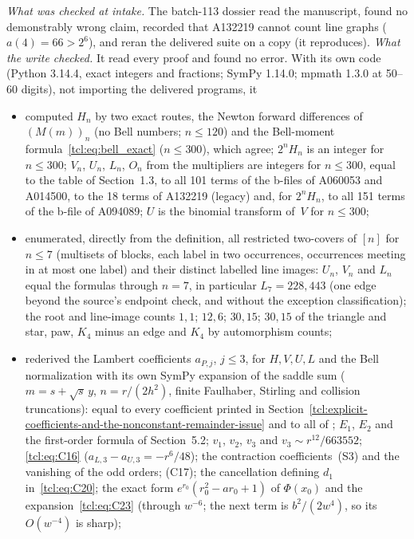 \begin{writenote}
\emph{What was checked at intake.} The batch-113 dossier read the manuscript,
found no demonstrably wrong claim, recorded that A132219 cannot count line
graphs ($a(4)=66>2^6$), and reran the delivered suite on a copy (it
reproduces). \emph{What the write checked.} It read every proof and found no
error. With its own code (Python 3.14.4, exact integers and fractions; SymPy
1.14.0; mpmath 1.3.0 at 50--60 digits), not importing the delivered programs,
it
\begin{itemize}\raggedright
\item computed $H_n$ by two exact routes, the Newton forward differences of
$(M(m))_n$ (no Bell numbers; $n\le120$) and the Bell-moment
formula~\eqref{tcl:eq:bell_exact} ($n\le300$), which agree; $2^nH_n$ is an
integer for $n\le300$; $V_n$, $U_n$, $L_n$, $O_n$ from the multipliers are
integers for $n\le300$, equal to the table of Section~1.3, to all 101 terms of
the b-files of A060053 and A014500, to the 18 terms of A132219 (legacy) and,
for $2^nH_n$, to all 151 terms of the b-file of A094089; $U$ is the binomial
transform of~$V$ for $n\le300$;
\item enumerated, directly from the definition, all restricted two-covers of
$[n]$ for $n\le7$ (multisets of blocks, each label in two occurrences,
occurrences meeting in at most one label) and their distinct labelled line
images: $U_n$, $V_n$ and $L_n$ equal the formulas through $n=7$, in
particular $L_7=228{,}443$ (one edge beyond the source's endpoint check, and
without the exception classification); the root and line-image counts
$1,1$; $12,6$; $30,15$; $30,15$ of the triangle and star, paw, $K_4$ minus an
edge and $K_4$ by automorphism counts;
\item rederived the Lambert coefficients $a_{P,j}$, $j\le3$, for $H,V,U,L$ and
the Bell normalization with its own SymPy expansion of the saddle sum ($m=s+\sqrt s\,y$,
$n=r/(2h^2)$, finite Faulhaber, Stirling and collision truncations): equal to
every coefficient printed in Section~\ref{tcl:explicit-coefficients-and-the-nonconstant-remainder-issue}
and to all of ; $E_1$, $E_2$ and the
first-order formula of Section~5.2; $v_1$, $v_2$, $v_3$ and $v_3\sim r^{12}/663552$;
\eqref{tcl:eq:C16} ($a_{L,3}-a_{U,3}=-r^6/48$); the contraction
coefficients~(S3) and the vanishing of the odd orders; (C17); the
cancellation defining $d_1$ in~\eqref{tcl:eq:C20}; the exact form
$e^{r_0}(r_0^2-ar_0+1)$ of $\Phi(x_0)$ and the expansion~\eqref{tcl:eq:C23}
(through $w^{-6}$; the next term is $b^2/(2w^4)$, so its $O(w^{-4})$ is sharp);

\end{itemize}
\end{writenote}
